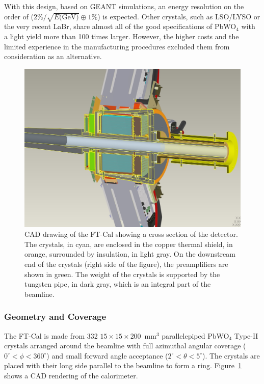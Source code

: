 With this design, based on GEANT simulations, an energy resolution on the order of
($2\% /\sqrt{E\textrm{(GeV)}} \oplus 1\%$) is expected. Other crystals, such as LSO/LYSO or the very recent
LaBr, share almost all of the good specifications of PbWO$_4$ with a light yield more than 100 times larger.
However, the higher costs and the limited experience in the manufacturing procedures excluded them from
consideration as an alternative.

\begin{figure}[th!]
\centering 
\includegraphics[width=0.85\columnwidth]{fig/section.jpg} 
\caption{CAD drawing of the FT-Cal showing a cross section of the detector. The crystals, in cyan, are enclosed in
  the copper thermal shield, in orange, surrounded by insulation, in light gray. On the downstream end of the
  crystals (right side of the figure), the preamplifiers are shown in green. The weight of the crystals is supported
  by the tungsten pipe, in dark gray, which is an integral part of the beamline.}
\label{fig:ft-cal-geometry} 
\end{figure}

\subsubsection{Geometry and Coverage}

The FT-Cal is made from 332 $15\times 15\times 200$~mm$^3$ parallelepiped PbWO$_4$ Type-II crystals
arranged around the beamline with full azimuthal angular coverage ($0^\circ < \phi < 360^\circ$)  and small
forward angle acceptance ($2^\circ < \theta < 5^\circ$). The crystals are placed with their long side parallel to
the beamline to form a ring. Figure~\ref{fig:ft-cal-geometry} shows a CAD rendering of the calorimeter. 

